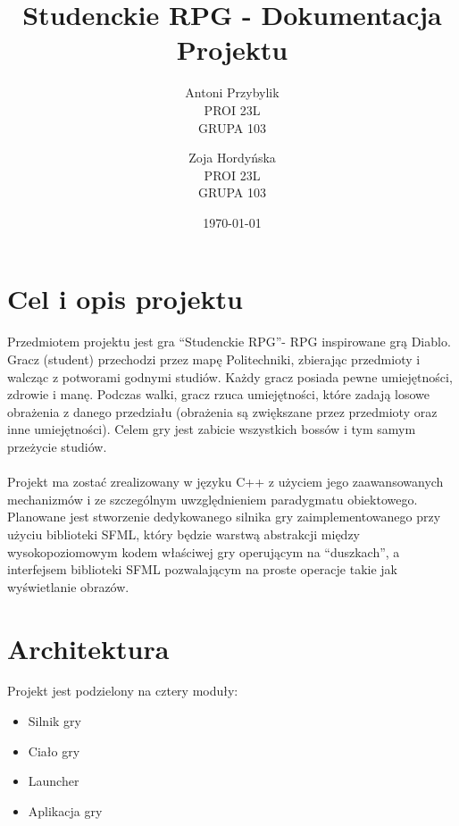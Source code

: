 \documentclass[12pt, titlepage]{article}
\author{Antoni Przybylik \\ PROI 23L \\ GRUPA 103 \and
	Zoja Hordyńska \\ PROI 23L \\ GRUPA 103}
\date{\today}
\title{Studenckie RPG - Dokumentacja Projektu}
\begin{document}
\maketitle
\justifying



\lstset{style=listingstyle}

\section{Cel i opis projektu}
Przedmiotem projektu jest gra "`Studenckie RPG"'- RPG
inspirowane grą Diablo. Gracz (student) przechodzi
przez mapę Politechniki, zbierając przedmioty i
walcząc z potworami godnymi studiów. Każdy gracz
posiada pewne umiejętności, zdrowie i manę.
Podczas walki, gracz rzuca umiejętności, które
zadają losowe obrażenia z danego przedziału
(obrażenia są zwiększane przez przedmioty oraz
inne umiejętności). Celem gry jest zabicie
wszystkich bossów i tym samym przeżycie studiów.
\\~\\
Projekt ma zostać zrealizowany w języku C++ z użyciem
jego zaawansowanych mechanizmów i ze szczególnym
uwzględnieniem paradygmatu obiektowego. Planowane
jest stworzenie dedykowanego silnika gry
zaimplementowanego przy użyciu biblioteki SFML, który
będzie warstwą abstrakcji między wysokopoziomowym
kodem właściwej gry operującym na "`duszkach"', a
interfejsem biblioteki SFML pozwalającym na
proste operacje takie jak wyświetlanie obrazów.

\newpage
\section{Architektura}
Projekt jest podzielony na cztery moduły:
\begin{itemize}
	\item Silnik gry
	\item Ciało gry
	\item Launcher
	\item Aplikacja gry
\end{itemize}
\end{document}
